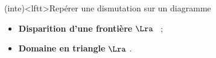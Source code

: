 \documentclass[../../main/main.tex]{subfiles}
\begin{document}
\begin{tcb*}(inte)<lftt>{Repérer une dismutation sur un diagramme}
	\begin{itemize}
		\item \textbf{Disparition d'une frontière} $\Lra$ ~;
		\item \textbf{Domaine en triangle} $\Lra$ .
	\end{itemize}
\end{tcb*}
\vspace{-15pt}
\end{document}
